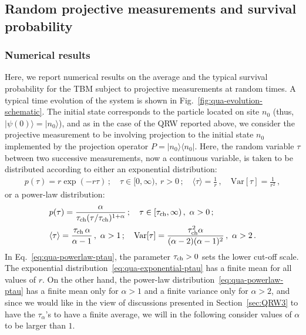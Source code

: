 \documentclass[12pt]{iopart}
\begin{document}
\subsection{Random projective measurements and survival probability}
\label{sec:TBM2}

\subsubsection{Numerical results}
\label{sec:TBM2a}

Here, we report numerical results on the average and the typical
survival probability for the TBM subject to projective measurements at
random times. A typical time evolution of the system is shown in
Fig.~\ref{fig:qua-evolution-schematic}. The initial state corresponds to the particle located on
site $n_0$ (thus,
$|\psi(0)\rangle=|n_0\rangle$), and as in the case of the QRW reported
above, we consider the projective measurement to be involving projection
to the initial state $n_0$ implemented by the projection
operator $P = |n_0\rangle \langle n_0|$.  Here, the random variable $\tau$
between two successive measurements, now a continuous variable, is taken to be
distributed according to either an exponential distribution:
\begin{align}
p(\tau)=r\exp(-r\tau) \,; \quad \tau \in [0,\infty), ~r>0 \, ; \quad \langle \tau \rangle = \frac{1}{r} \, , \quad {\mathrm{Var}}[\tau] = \frac{1}{r^2} \, ,
\label{eq:qua-exponential-ptau}
\end{align}
or a power-law distribution:
\begin{equation}
\begin{aligned}
& p(\tau)=\frac{\alpha}{\tau_{\rm ch}(\tau/\tau_{\rm ch})^{1+\alpha}}  \, ; \quad \tau \in [\tau_{\rm ch},\infty) \,, ~\alpha > 0  \, ;   \\
& \langle \tau \rangle = \frac{ \tau_{\rm ch} \, \alpha}{\alpha - 1} \,  , ~\alpha > 1 \,; \quad {\mathrm{Var}}[\tau] = \frac{\tau^2_{\mathrm{ch}} \alpha }{(\alpha-2) (\alpha-1)^2}\, , ~\alpha >2\, .
\label{eq:qua-powerlaw-ptau}
\end{aligned}
\end{equation}
In Eq.~\eqref{eq:qua-powerlaw-ptau}, the parameter $\tau_{\rm
ch}>0$ sets the lower cut-off scale. The exponential distribution~\eqref{eq:qua-exponential-ptau} has a finite mean for all
values of $r$. On the other hand, the power-law distribution~\eqref{eq:qua-powerlaw-ptau} has
a finite mean only for $\alpha>1$ and a finite variance only for $\alpha>2$, and since we would like in the view
of discussions presented in Section~\ref{sec:QRW3} to have the
$\tau_\alpha$'s to have a finite average, we will in the following
consider values of $\alpha$ to be larger than $1$.   
\end{document}
